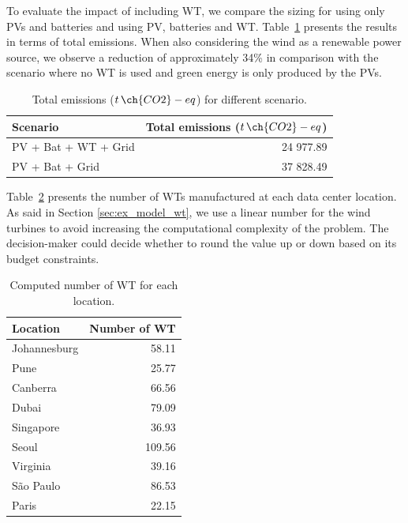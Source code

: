 To evaluate the impact of including WT, we compare the sizing for using only PVs and batteries and using PV, batteries and WT. Table~\ref{tab:total_wind_and_pv_co2} presents the results in terms of total emissions. When also considering the wind as a renewable power source, we observe a reduction of approximately 34\% in comparison with the scenario where no WT is used and green energy is only produced by the PVs.

\begin{table}[h]  
  \caption{Total emissions ($t\,\ch{CO2}-eq$) for different scenario. }\label{tab:total_wind_and_pv_co2} \centering  
  \begin{tabular}{|l|r|}
  \hline    
  \textbf{Scenario} &   \textbf{Total emissions ($t\,\ch{CO2}-eq$)} \\
  \hline    
  PV + Bat + WT + Grid  & 24 977.89 \\    
  \hline
  PV + Bat + Grid       & 37 828.49 \\    
  \hline
\end{tabular}  
\end{table}


Table~\ref{tab:results_wt} presents the number of WTs manufactured at each data center location. As said in Section \ref{sec:ex_model_wt}, we use a linear number for the wind turbines to avoid increasing the computational complexity of the problem. The decision-maker could decide whether to round the value up or down based on its budget constraints.

\begin{table}[h]
  \caption{Computed number of WT for each location.}\label{tab:results_wt} \centering
  \begin{tabular}{|l|r|}
  \hline
    
  \textbf{Location} &   \textbf{Number of WT} \\
  \hline
  Johannesburg & 58.11   \\
  \hline
  Pune  & 25.77 \\
  \hline
  Canberra  & 66.56 \\
  \hline
  Dubai   &  79.09  \\
  \hline
  Singapore & 36.93  \\
  \hline     
  Seoul    & 109.56  \\
  \hline
  Virginia   & 39.16 \\
  \hline
  São Paulo   & 86.53 \\
  \hline 
  Paris    &   22.15 \\
  \hline
  
\end{tabular}  
\end{table}

